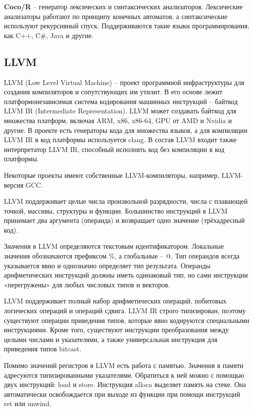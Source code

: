 \textbf{Coco/R} -- генератор лексических и синтаксических анализаторов. Лексические анализаторы работают по принципу конечных автоматов, а синтаксические используют рекурсивный спуск. Поддерживаются такие языки программирования, как C++, C\#, Java и другие. \\

\subsection{LLVM}
LLVM (Low Level Virtual Machine) -- проект программной инфраструктуры для создания компиляторов и сопутствующих им утилит. В его основе лежит платформонезависимая система кодирования машинных инструкций -- байткод LLVM IR (Intermediate Representation). LLVM может создавать байткод для множества платформ, включая ARM, x86, x86-64, GPU от AMD и Nvidia и другие. В проекте есть генераторы кода для множества языков, а для компиляции LLVM IR в код платформы используется clang. В состав LLVM  входит также интерпретатор LLVM IR, способный исполнять код без компиляции в код платформы. \cite{bib:llvm}

Некоторые проекты имеют собственные LLVM-компиляторы, например, LLVM-версия GCC.

LLVM поддерживает целые числа произвольной разрядности, числа с плавающей точкой, массивы, структуры и функции. Большинство инструкций в LLVM принимает два аргумента (операнда) и возвращает одно значение (трёхадресный код).

Значения в LLVM определяются текстовым идентификатором. Локальные значения обозначаются префиксом \%, а глобальные – @. Тип операндов всегда указывается явно и однозначно определяет тип результата. Операнды арифметических инструкций должны иметь одинаковый тип, но сами инструкции «перегружены» для любых числовых типов и векторов.

LLVM поддерживает полный набор арифметических операций, побитовых логических операций и операций сдвига. LLVM IR строго типизирован, поэтому существуют
операции приведения типов, которые явно кодируются специальными инструкциями. Кроме того, существуют инструкции преобразования между целыми числами и
указателями, а также универсальная инструкция для приведения типов bitcast.

Помимо значений ­регистров в LLVM есть работа с памятью. Значения в памяти адресуются типизированными указателями. Обратиться к ней можно с помощью двух инструкций: load и store. Инструкция alloca выделяет память на стеке. Она автоматически освобождается при выходе из функции при помощи инструкций ret или unwind.

